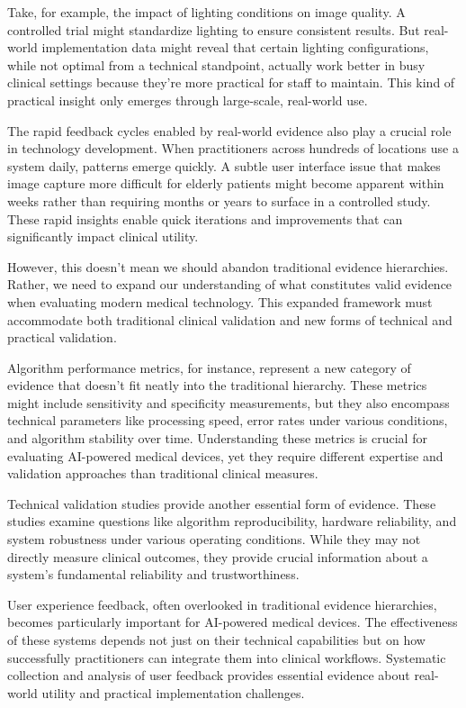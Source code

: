 \documentclass[
  Letterpaper,
]{scrbook}
\begin{document}
Take, for example, the impact of lighting conditions on image quality. A
controlled trial might standardize lighting to ensure consistent
results. But real-world implementation data might reveal that certain
lighting configurations, while not optimal from a technical standpoint,
actually work better in busy clinical settings because they're more
practical for staff to maintain. This kind of practical insight only
emerges through large-scale, real-world use.

The rapid feedback cycles enabled by real-world evidence also play a
crucial role in technology development. When practitioners across
hundreds of locations use a system daily, patterns emerge quickly. A
subtle user interface issue that makes image capture more difficult for
elderly patients might become apparent within weeks rather than
requiring months or years to surface in a controlled study. These rapid
insights enable quick iterations and improvements that can significantly
impact clinical utility.

However, this doesn't mean we should abandon traditional evidence
hierarchies. Rather, we need to expand our understanding of what
constitutes valid evidence when evaluating modern medical technology.
This expanded framework must accommodate both traditional clinical
validation and new forms of technical and practical validation.

Algorithm performance metrics, for instance, represent a new category of
evidence that doesn't fit neatly into the traditional hierarchy. These
metrics might include sensitivity and specificity measurements, but they
also encompass technical parameters like processing speed, error rates
under various conditions, and algorithm stability over time.
Understanding these metrics is crucial for evaluating AI-powered medical
devices, yet they require different expertise and validation approaches
than traditional clinical measures.

Technical validation studies provide another essential form of evidence.
These studies examine questions like algorithm reproducibility, hardware
reliability, and system robustness under various operating conditions.
While they may not directly measure clinical outcomes, they provide
crucial information about a system's fundamental reliability and
trustworthiness.

User experience feedback, often overlooked in traditional evidence
hierarchies, becomes particularly important for AI-powered medical
devices. The effectiveness of these systems depends not just on their
technical capabilities but on how successfully practitioners can
integrate them into clinical workflows. Systematic collection and
analysis of user feedback provides essential evidence about real-world
utility and practical implementation challenges.
\end{document}

